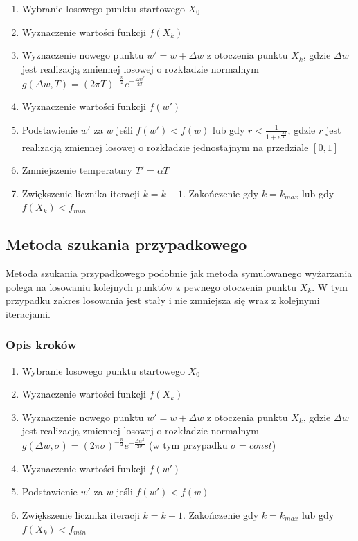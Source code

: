 \documentclass{article}
\begin{document}
\begin{enumerate}
    \item Wybranie losowego punktu startowego $X_0$
    \item Wyznaczenie wartości funkcji $f(X_k)$
    \item Wyznaczenie nowego punktu $w'= w + \Delta w$ z otoczenia punktu $X_k$,
    gdzie $\Delta w$ jest realizacją zmiennej losowej o rozkładzie normalnym
    $g(\Delta w,T) = (2 \pi T) ^{-\frac{n}{2}} e^{-\frac{{\Delta w }^2}{2T}}$
    \item Wyznaczenie wartości funkcji $f(w')$
    \item Podstawienie $w'$ za $w$ jeśli $f(w') < f(w)$ lub gdy
    $r < \frac{1}{1 + e^{\frac{\Delta f}{T}}}$, gdzie $r$ jest realizacją zmiennej
    losowej o rozkładzie jednostajnym na przedziale $[0, 1]$
    \item Zmniejszenie temperatury $T' = \alpha T$
    \item Zwiększenie licznika iteracji $k = k + 1$. Zakończenie gdy $k = k_{max}$ lub gdy $f(X_k) < f_{min}$
\end{enumerate}

\subsection{Metoda szukania przypadkowego}
Metoda szukania przypadkowego podobnie jak metoda symulowanego
wyżarzania polega na losowaniu kolejnych punktów z pewnego
otoczenia punktu $X_k$. W tym przypadku zakres losowania
jest stały i nie zmniejsza się wraz z kolejnymi iteracjami.

\subsubsection{Opis kroków}

\begin{enumerate}
    \item Wybranie losowego punktu startowego $X_0$
    \item Wyznaczenie wartości funkcji $f(X_k)$
    \item Wyznaczenie nowego punktu $w'= w + \Delta w$ z otoczenia punktu $X_k$,
    gdzie $\Delta w$ jest realizacją zmiennej losowej o rozkładzie normalnym
    $g(\Delta w,\sigma) = (2 \pi \sigma) ^{-\frac{n}{2}} e^{-\frac{{\Delta w }^2}{2\sigma}}$
    (w tym przypadku $\sigma = const$)
    \item Wyznaczenie wartości funkcji $f(w')$
    \item Podstawienie $w'$ za $w$ jeśli $f(w') < f(w)$ 
    \item Zwiększenie licznika iteracji $k = k + 1$. Zakończenie gdy $k = k_{max}$ lub gdy $f(X_k) < f_{min}$
\end{enumerate}
\end{document}
